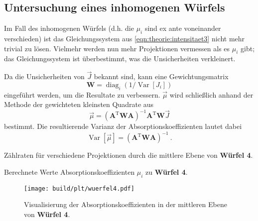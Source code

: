 \subsection{Untersuchung eines inhomogenen Würfels}
Im Fall des inhomogenen Würfels
(d.h. die $\mu_i$ sind ex ante voneinander verschieden)
ist das Gleichungssystem aus \ref{eqn:theorie:intensitaet3} nicht mehr trivial zu lösen.
Vielmehr werden nun mehr Projektionen vermessen als es $\mu_i$ gibt;
das Gleichungssystem ist überbestimmt,
was die Unsicherheiten verkleinert.

\def\A{\symbf{A}}
\def\W{\symbf{W}}
\def\T{\mathrm{T}}

Da die Unsicherheiten von $\vec{J}$ bekannt sind,
kann eine Gewichtungsmatrix
\[ \symbf{W} = \operatorname{diag}_i (1 / \operatorname{Var}[J_i]) \]
eingeführt werden,
um die Resultate zu verbessern.
$\vec{\mu}$ wird schließlich anhand der Methode der gewichteten kleinsten Quadrate aus
\begin{equation*}
    \vec{\mu} = (\A^\T \W \A)^{-1} \A^\T \W \vec{J}
\end{equation*}
bestimmt.
Die resultierende Varianz der Absorptionskoeffizienten lautet dabei
\begin{equation*}
    \operatorname{Var}[\vec{\mu}] = (\A^\T \W \A)^{-1} \ .
\end{equation*}



\begin{table}[H]
    \centering
    \caption{Zählraten für verschiedene Projektionen durch die mittlere Ebene von \textbf{Würfel 4}.}
    \label{tab:auswertung:wuerfel4}
\end{table}

\begin{table}[H]
    \centering
    \caption{Berechnete Werte Absorptionskoeffizienten $\mu_i$ zu \textbf{Würfel 4}.}
    \label{tab:auswertung:wuerfel4_mu}
\end{table}

\begin{figure}
    \centering
    \texttt{[image: build/plt/wuerfel4.pdf]}
    \caption{Visualisierung der Absorptionskoeffizienten in der mittleren Ebene von \textbf{Würfel 4}.}
    \label{plt:auswertung:wuerfel4}
\end{figure}
